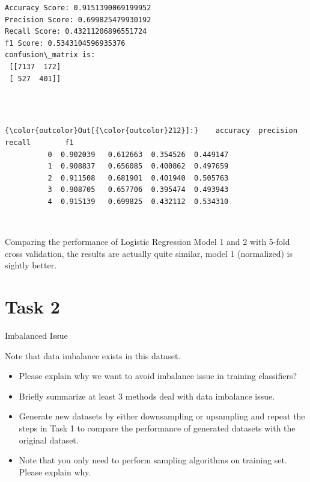 \documentclass[11pt]{article}
\begin{document}
   

    \begin{Verbatim}[commandchars=\\\{\}]
Accuracy Score: 0.9151390069199952
Precision Score: 0.699825479930192
Recall Score: 0.43211206896551724
f1 Score: 0.5343104596935376
confusion\_matrix is: 
 [[7137  172]
 [ 527  401]] 


    \end{Verbatim}

   

    \begin{center}
    \end{center}
    { \hspace*{\fill} \\}
    
\begin{Verbatim}[commandchars=\\\{\}]
{\color{outcolor}Out[{\color{outcolor}212}]:}    accuracy  precision    recall        f1
          0  0.902039   0.612663  0.354526  0.449147
          1  0.908837   0.656085  0.400862  0.497659
          2  0.911508   0.681901  0.401940  0.505763
          3  0.908705   0.657706  0.395474  0.493943
          4  0.915139   0.699825  0.432112  0.534310
\end{Verbatim}
            
    \begin{center}
    \end{center}
    { \hspace*{\fill} \\}
    
    Comparing the performance of Logistic Regression Model 1 and 2 with
5-fold cross validation, the results are actually quite similar, model 1
(normalized) is sightly better.

    \section*{Task 2}\label{task-2}

Imbalanced Issue

Note that data imbalance exists in this dataset.

\begin{itemize}
\item
  Please explain why we want to avoid imbalance issue in training
  classifiers?
\item
  Briefly summarize at least 3 methods deal with data imbalance issue.
\item
  Generate new datasets by either downsampling or upsampling and repeat
  the steps in Task 1 to compare the performance of generated datasets
  with the original dataset.
\item
  Note that you only need to perform sampling algorithms on training
  set. Please explain why.
\end{itemize}
\end{document}

